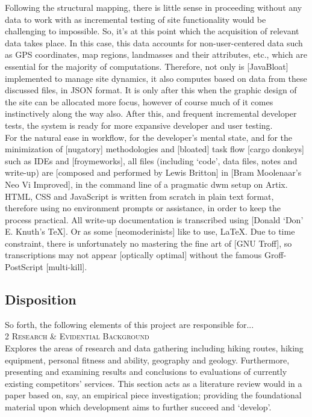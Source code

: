 \documentclass[11pt, english]{article}
\begin{document}
	Following the structural mapping, there is little sense in proceeding without any data to work with as incremental testing of site functionality would be challenging to impossible. So, it's at this point which the acquisition of relevant data takes place. In this case, this data accounts for non-user-centered data such as GPS coordinates, map regions, landmasses and their attributes, etc., which are essential for the majority of computations. Therefore, not only is [JavaBloat] implemented to manage site dynamics, it also computes based on data from these discussed files, in JSON format. It is only after this when the graphic design of the site can be allocated more focus, however of course much of it comes instinctively along the way also. After this, and frequent incremental developer tests, the system is ready for more expansive developer and user testing.\\

	For the natural ease in workflow, for the developer's mental state, and for the minimization of [nugatory] methodologies and [bloated] task flow [cargo donkeys] such as IDEs and [froymeworks], all files (including `code', data files, notes and write-up) are [composed and performed by Lewis Britton] in [Bram Moolenaar's Neo Vi Improved], in the command line of a pragmatic dwm setup on Artix. HTML, CSS and JavaScript is written from scratch in plain text format, therefore using no environment prompts or assistance, in order to keep the process practical. All write-up documentation is transcribed using [Donald `Don' E. Knuth's \TeX]. Or as some [neomoderinists] like to use, \LaTeX. Due to time constraint, there is unfortunately no mastering the fine art of [GNU Troff], so transcriptions may not appear [optically optimal] without the famous Groff-PostScript [multi-kill].

\newpage

	\subsection{Disposition}

	So forth, the following elements of this project are responsible for...\\

	\textsc{2 Research \& Evidential Background}\\

	Explores the areas of research and data gathering including hiking routes, hiking equipment, personal fitness and ability, geography and geology. Furthermore, presenting and examining results and conclusions to evaluations of currently existing competitors' services. This section acts as a literature review would in a paper based on, say, an empirical piece investigation; providing the foundational material upon which development aims to further succeed and `develop'.\\
\end{document}
